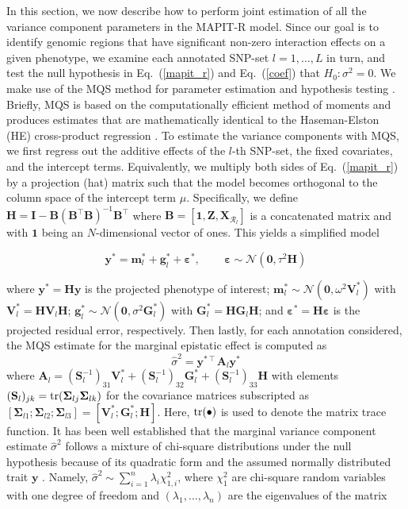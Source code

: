\documentclass[10pt]{article}
\def\eq#1{(\ref{#1})}
\def\tr{{\rm tr}}
\newcommand{\bg}{\mathbf{g}}
\newcommand{\by}{\mathbf{y}}
\newcommand{\bfm}{\mathbf{m}}
\newcommand{\bV}{\mathbf{V}}
\newcommand{\bA}{\mathbf{A}}
\newcommand{\bB}{\mathbf{B}}
\newcommand{\bX}{\mathbf{X}}
\newcommand{\bG}{\mathbf{G}}
\newcommand{\bH}{\mathbf{H}}
\newcommand{\bZ}{\mathbf{Z}}
\newcommand{\bI}{\mathbf{I}}
\newcommand{\bS}{\mathbf{S}}
\newcommand{\T}{\intercal}
\newcommand{\wh}{\widehat}
\newcommand{\N}{\mathcal{N}}
\newcommand{\bvarepsilon}{\boldsymbol\varepsilon}
\newcommand{\bSigma}{\boldsymbol\Sigma}
\begin{document}
In this section, we now describe how to perform joint estimation of all the variance component parameters in the MAPIT-R model. Since our goal is to identify genomic regions that have significant non-zero interaction effects on a given phenotype, we examine each annotated SNP-set $l = 1,\ldots, L$ in turn, and test the null hypothesis in Eq.~\eq{mapit_r} and Eq.~\eq{coef} that $H_0: \sigma^2=0$. We make use of the MQS method for parameter estimation and hypothesis testing \cite{Zhou2017}. Briefly, MQS is based on the computationally efficient method of moments and produces estimates that are mathematically identical to the Haseman-Elston (HE) cross-product regression \cite{Haseman1972}. To estimate the variance components with MQS, we first regress out the additive effects of the $l$-th SNP-set, the fixed covariates, and the intercept terms. Equivalently, we multiply both sides of Eq.~\eq{mapit_r} by a projection (hat) matrix such that the model becomes orthogonal to the column space of the intercept term $\mu$. Specifically, we define $\bH=\bI-\bB(\bB^{\T}\bB)^{-1}\bB^{\T}$ where $\bB = [\bm{1},\bZ,\bX_{\mathcal{R}_l}]$ is a concatenated matrix and with $\bm{1}$ being an $N$-dimensional vector of ones. This yields a simplified model
\begin{linenomath*}
\begin{equation}
\by^* = \bfm_l^* + \bg_l^* +\bvarepsilon^*, \quad \, \quad  \bvarepsilon\sim \N(\bm{0},\tau^2\bH)\label{mapit_r2}
\end{equation}
\end{linenomath*}
where $\by^* = \bH\by$ is the projected phenotype of interest; $\bfm_l^*\sim \N(\bm{0},\omega^2\bV_l^*)$ with $\bV_l^* = \bH\bV_l\bH$; $\bg_l^*\sim \N(\bm{0},\sigma^2\bG_l^*)$ with $\bG_l^* = \bH\bG_l\bH$; and $\bvarepsilon^* = \bH\bvarepsilon$ is the projected residual error, respectively. Then lastly, for each annotation considered, the MQS estimate for the marginal epistatic effect is computed as
\begin{equation}
\wh\sigma^2 = \by^{*\T}\bA_l\by^*
\end{equation}
where $\bA_{l} = (\bS_l^{-1})_{31}\bV_l^*+(\bS_l^{-1})_{32}\bG^*_l+(\bS_l^{-1})_{33}\bH$ with elements $(\bS_l)_{jk} = \tr(\bSigma_{lj} \bSigma_{lk})$ for the covariance matrices subscripted as $[\bSigma_{l1}; \bSigma_{l2}; \bSigma_{l3}]  = [\bV^*_l; \bG^*_l; \bH]$. Here, $\tr(\bullet)$ is used to denote the matrix trace function. It has been well established that the marginal variance component estimate $\wh\sigma^2$ follows a mixture of chi-square distributions under the null hypothesis because of its quadratic form and the assumed normally distributed trait $\by$ \cite{Liu2010,Wu2011,Lee2012,Ionita-Laza2013,Crawford2017a,Wang2017}. Namely, $\wh\sigma^2 \sim \sum_{i=1}^{n}\lambda_{i}\chi^2_{1,i}$, where $\chi^2_{1}$ are chi-square random variables with one degree of freedom and $(\lambda_{1},\ldots,\lambda_{n})$ are the eigenvalues of the matrix \cite{Crawford2017a,Zhou2017}
\end{document}
